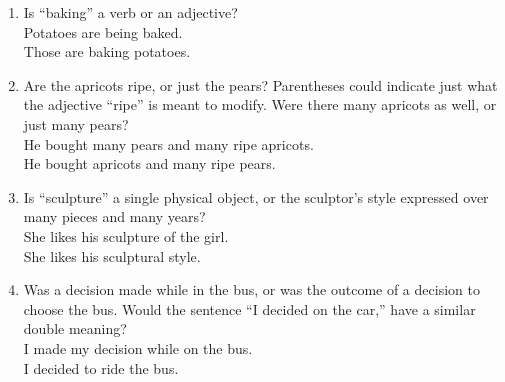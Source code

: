 
\begin{enumerate}
%
\item Is ``baking'' a verb or an adjective?\\
Potatoes are being baked.\\
Those are baking potatoes.
%
\item Are the apricots ripe, or just the pears?  Parentheses could indicate just what the adjective ``ripe'' is meant to modify.  Were there many apricots as well, or just many pears?\\
He bought many pears and many ripe apricots.\\
He bought apricots and many ripe pears.
%
\item Is ``sculpture'' a single physical object, or the sculptor's style expressed over many pieces and many years?\\
She likes his sculpture of the girl.\\
She likes his sculptural style.
%
\item Was a decision made while in the bus, or was the outcome of a decision to choose the bus.  Would the sentence ``I decided on the car,'' have a similar double meaning?\\
I made my decision while on the bus.\\
I decided to ride the bus.
\end{enumerate}